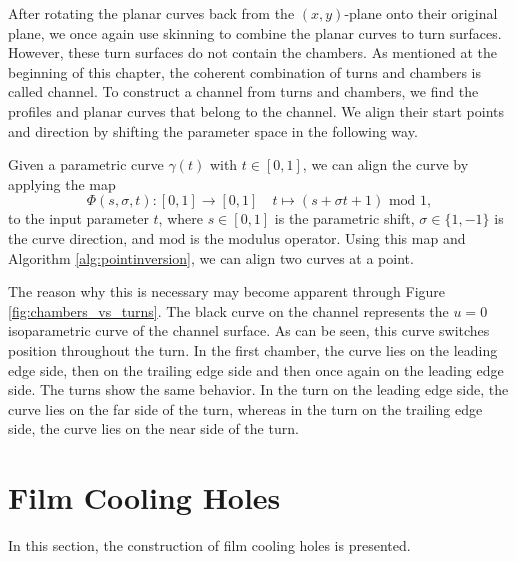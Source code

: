 \documentclass[a4paper, 11pt]{report}
\theoremstyle{definition}
\begin{document}
	After rotating the planar curves back from the $(x,y)$-plane onto their original plane, we once again use skinning to combine the planar curves to turn surfaces. However, these turn surfaces do not contain the chambers. As mentioned at the beginning of this chapter, the coherent combination of turns and chambers is called channel. To construct a channel from turns and chambers, we find the profiles and planar curves that belong to the channel. We align their start points and direction by shifting the parameter space in the following way.

	Given a parametric curve $\gamma(t)$ with $t \in [0,1]$, we can align the curve by applying the map
		$$ \Phi(s, \sigma, t): [0,1] \rightarrow [0,1] \quad t \mapsto (s+\sigma t+1) \textrm{ mod } 1, $$
	to the input parameter $t$, where $s \in [0,1]$ is the parametric shift, $\sigma \in \{1, -1\}$ is the curve direction, and $\textrm{mod}$ is the modulus operator. Using this map and Algorithm \ref{alg:pointinversion}, we can align two curves at a point.

	The reason why this is necessary may become apparent through Figure \ref{fig:chambers_vs_turns}. The black curve on the channel represents the $u=0$ isoparametric curve of the channel surface. As can be seen, this curve switches position throughout the turn. In the first chamber, the curve lies on the leading edge side, then on the trailing edge side and then once again on the leading edge side. The turns show the same behavior. In the turn on the leading edge side, the curve lies on the far side of the turn, whereas in the turn on the trailing edge side, the curve lies on the near side of the turn.

\section{Film Cooling Holes}\label{sec:filmcooling}
	In this section, the construction of film cooling holes is presented.
\end{document}
